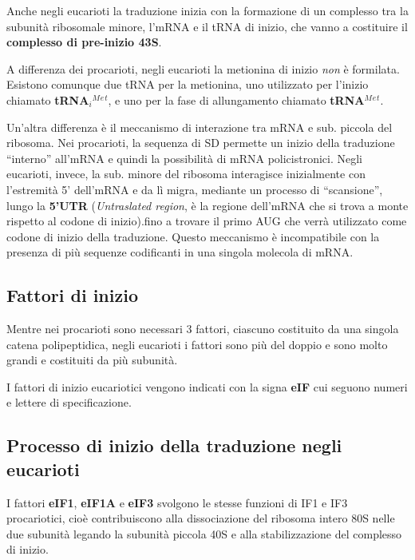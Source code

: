 \documentclass[11pt]{book}
\begin{document}
Anche negli eucarioti la traduzione inizia con la formazione di un
complesso tra la subunità ribosomale minore, l'mRNA e il tRNA di inizio,
che vanno a costituire il \textbf{complesso di pre-inizio 43S}.

A differenza dei procarioti, negli eucarioti la metionina di inizio
\emph{non} è formilata. Esistono comunque due tRNA per la metionina, uno
utilizzato per l'inizio chiamato \textbf{tRNA\(_i\)\(^M\)\(^e\)\(^t\)},
e uno per la fase di allungamento chiamato
\textbf{tRNA\(^M\)\(^e\)\(^t\)}.

Un'altra differenza è il meccanismo di interazione tra mRNA e sub.
piccola del ribosoma. Nei procarioti, la sequenza di SD permette un
inizio della traduzione ``interno'' all'mRNA e quindi la possibilità di
mRNA policistronici. Negli eucarioti, invece, la sub. minore del
ribosoma interagisce inizialmente con l'estremità 5' dell'mRNA e da lì
migra, mediante un processo di ``scansione'', lungo la \textbf{5'UTR}
(\emph{Untraslated region}, è la regione dell'mRNA che si trova a monte
rispetto al codone di inizio).fino a trovare il primo AUG che verrà
utilizzato come codone di inizio della traduzione. Questo meccanismo è
incompatibile con la presenza di più sequenze codificanti in una singola
molecola di mRNA.

\subsection{Fattori di inizio}\label{fattori-di-inizio}

Mentre nei procarioti sono necessari 3 fattori, ciascuno costituito da
una singola catena polipeptidica, negli eucarioti i fattori sono più del
doppio e sono molto grandi e costituiti da più subunità.

I fattori di inizio eucariotici vengono indicati con la signa
\textbf{eIF} cui seguono numeri e lettere di specificazione.

\subsection{Processo di inizio della traduzione negli
eucarioti}\label{processo-di-inizio-della-traduzione-negli-eucarioti}

I fattori \textbf{eIF1}, \textbf{eIF1A} e \textbf{eIF3} svolgono le
stesse funzioni di IF1 e IF3 procariotici, cioè contribuiscono alla
dissociazione del ribosoma intero 80S nelle due subunità legando la
subunità piccola 40S e alla stabilizzazione del complesso di inizio.
\end{document}
